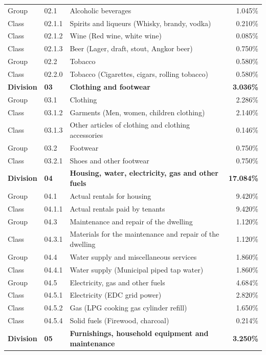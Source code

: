 \documentclass[11pt,a4paper]{article}
\begin{document}
\begin{longtable}{llp{7.5cm}r}
Group & 02.1 & Alcoholic beverages & 1.045\% \\
Class & 02.1.1 & Spirits and liqueurs (Whisky, brandy, vodka) & 0.210\% \\
Class & 02.1.2 & Wine (Red wine, white wine) & 0.085\% \\
Class & 02.1.3 & Beer (Lager, draft, stout, Angkor beer) & 0.750\% \\
Group & 02.2 & Tobacco & 0.580\% \\
Class & 02.2.0 & Tobacco (Cigarettes, cigars, rolling tobacco) & 0.580\% \\
\midrule
\textbf{Division} & \textbf{03} & \textbf{Clothing and footwear} & \textbf{3.036\%} \\
Group & 03.1 & Clothing & 2.286\% \\
Class & 03.1.2 & Garments (Men, women, children clothing) & 2.140\% \\
Class & 03.1.3 & Other articles of clothing and clothing accessories & 0.146\% \\
Group & 03.2 & Footwear & 0.750\% \\
Class & 03.2.1 & Shoes and other footwear & 0.750\% \\
\midrule
\textbf{Division} & \textbf{04} & \textbf{Housing, water, electricity, gas and other fuels} & \textbf{17.084\%} \\
Group & 04.1 & Actual rentals for housing & 9.420\% \\
Class & 04.1.1 & Actual rentals paid by tenants & 9.420\% \\
Group & 04.3 & Maintenance and repair of the dwelling & 1.120\% \\
Class & 04.3.1 & Materials for the maintenance and repair of the dwelling & 1.120\% \\
Group & 04.4 & Water supply and miscellaneous services & 1.860\% \\
Class & 04.4.1 & Water supply (Municipal piped tap water) & 1.860\% \\
Group & 04.5 & Electricity, gas and other fuels & 4.684\% \\
Class & 04.5.1 & Electricity (EDC grid power) & 2.820\% \\
Class & 04.5.2 & Gas (LPG cooking gas cylinder refill) & 1.650\% \\
Class & 04.5.4 & Solid fuels (Firewood, charcoal) & 0.214\% \\
\midrule
\textbf{Division} & \textbf{05} & \textbf{Furnishings, household equipment and maintenance} & \textbf{3.250\%} \\

\end{longtable}
\end{document}
